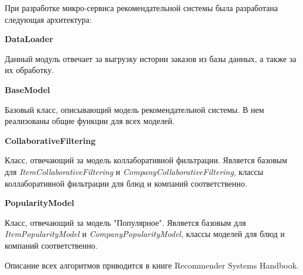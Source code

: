 При разработке микро-сервиса рекомендательной системы была разработана следующая
архитектура:

\textbf{DataLoader}

Данный модуль отвечает за выгрузку истории заказов из базы данных, а также за
их обработку.

\textbf{BaseModel}

Базовый класс, описывающий модель рекомендательной системы. В нем реализованы общие
функции для всех моделей.

\textbf{CollaborativeFiltering}

Класс, отвечающий за модель коллаборативной фильтрации. Является базовым
для \textit{ItemCollaborativeFiltering} и \textit{CompanyCollaborativeFiltering},
классы коллаборативной фильтрации для блюд и компаний соответственно.

\textbf{PopularityModel}

Класс, отвечающий за модель "Популярное". Является базовым
для \textit{ItemPopularityModel} и \textit{CompanyPopularityModel},
классы моделей для блюд и компаний соответственно.

Описание всех алгоритмов приводится в книге Recommender Systems
Handbook.
